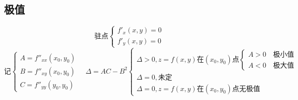 \subsection{极值}
$$\mbox{驻点}\begin{cases}
	f'_x(x,y)=0\\
	f'_y(x,y)=0
\end{cases}$$
$$\mbox{记}\begin{cases}
	A=f''_{xx}(x_0,y_0)\\
	B=f''_{xy}(x_0,y_0)\\
	C=f''_{yy}(y_0,y_0)
\end{cases}\quad
\Delta=AC-B^2\begin{cases}
	\Delta>0,z=f(x,y)\mbox{在}(x_0,y_0)\mbox{点}\begin{cases}
		A>0\quad\mbox{极小值}\\
		A<0\quad\mbox{极大值}
	\end{cases}\\
	\Delta=0,\mbox{未定}\\
	\Delta=0,z=f(x,y)\mbox{在}(x_0,y_0)\mbox{点无极值}
\end{cases}$$
